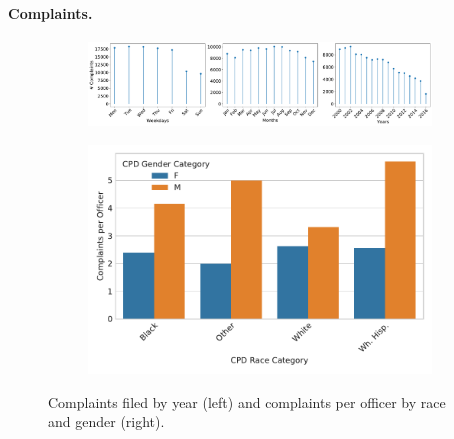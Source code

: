 \paragraph{Complaints.} 
\begin{figure}[t!] 
\begin{subfigure}{0.44\textwidth}
	\includegraphics[width=\textwidth, clip, trim= 970 0 0 0]{figs/complaints_times} 
\end{subfigure}
\begin{subfigure}{0.52\textwidth}
	\includegraphics[width=\textwidth]{figs/complaints} 
\end{subfigure}
	\caption{Complaints filed by year (left) and complaints per officer by race and gender (right).} \label{fig:complaints}
\end{figure}
